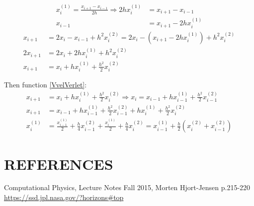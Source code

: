 \documentclass[a4paper]{article}
\begin{document}
\begin{align}
x_i^{(1)} = \frac{x_{i+1} - x_{i-1}}{2h} \Rightarrow 2hx_i^{(1)} &= x_{i+1} - x_{i-1} \\
x_{i-1} &= x_{i+1} - 2hx_i^{(1)}
\end{align}
\begin{align}
x_{i+1} &= 2x_i - x_{i-1} + h^2 x_i^{(2)} = 2x_i - \left( x_{i+1} - 2hx_i^{(1)} \right)  + h^2 x_i^{(2)} \\
2 x_{i+1} &= 2x_i + 2hx_i^{(1)} + h^2 x_i^{(2)} \\
x_{i+1} &= x_i + hx_i^{(1)} + \frac{h^2}{2} x_i^{(2)} 
\end{align}

Then function \ref{VvelVerlet}:
\begin{align}
x_{i+1} &= x_i + hx_i^{(1)} + \frac{h^2}{2} x_i^{(2)} \Rightarrow x_{i} = x_{i-1} + hx_{i-1}^{(1)} + \frac{h^2}{2} x_{i-1}^{(2)} \\
x_{i+1} &= x_{i-1} + hx_{i-1}^{(1)} + \frac{h^2}{2} x_{i-1}^{(2)} + hx_i^{(1)} + \frac{h^2}{2} x_i^{(2)} \\
x_i^{(1)} &= \frac{x_{i-1}^{(1)}}{2} + \frac{h}{4} x_{i-1}^{(2)} + \frac{x_i^{(1)}}{2} + \frac{h}{4} x_i^{(2)}
= x_{i-1}^{(1)} + \frac{h}{2} \left( x_i^{(2)} + x_{i-1}^{(2)} \right) 
\end{align}


\section{REFERENCES}
\begin{thebibliography}{9}
	Computational Physics, Lecture Notes Fall 2015, Morten Hjort-Jensen p.215-220
	\url{https://ssd.jpl.nasa.gov/?horizons#top}
\end{thebibliography}




\end{document}
